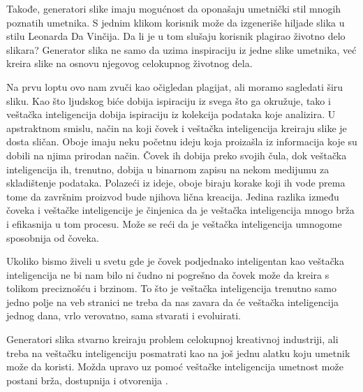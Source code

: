 \documentclass[12pt, letterpaper]{article}
\begin{document}
Takođe, generatori slike imaju mogućnost da oponašaju umetnički stil mnogih poznatih umetnika. S jednim klikom korisnik može da izgeneriše hiljade slika u stilu Leonarda Da Vinčija. Da li je u tom slušaju korisnik plagirao životno delo slikara? Generator slika ne samo da uzima inspiraciju iz jedne slike umetnika, već kreira slike na osnovu njegovog celokupnog životnog dela.

Na prvu loptu ovo nam zvuči kao očigledan plagijat, ali moramo sagledati širu sliku. Kao što ljudskog biće dobija ispiraciju iz svega što ga okružuje, tako i veštačka inteligencija dobija ispiraciju iz kolekcija podataka koje analizira. U apstraktnom smislu, način na koji čovek i veštačka inteligencija kreiraju slike je dosta sličan. Oboje imaju neku početnu ideju koja proizašla iz informacija koje su dobili na njima prirodan način. Čovek ih dobija preko svojih čula, dok veštačka inteligencija ih, trenutno, dobija u binarnom zapisu na nekom medijumu za skladištenje podataka. Polazeći iz ideje, oboje biraju korake koji ih vode prema tome da završnim proizvod bude njihova lična kreacija. Jedina razlika između čoveka i veštačke inteligencije je činjenica da je veštačka inteligencija mnogo brža i efikasnija u tom procesu. Može se reći da je veštačka inteligencija umnogome sposobnija od čoveka. 

Ukoliko bismo živeli u svetu gde je čovek podjednako inteligentan kao veštačka inteligencija ne bi nam bilo ni čudno ni pogrešno da čovek može da kreira s tolikom preciznošću i brzinom. To što je veštačka inteligencija trenutno samo jedno polje na veb stranici ne treba da nas zavara da će veštačka inteligencija jednog dana, vrlo verovatno, sama stvarati i evoluirati.

Generatori slika stvarno kreiraju problem celokupnoj kreativnoj industriji, ali treba na veštačku inteligenciju posmatrati kao na još jednu alatku koju umetnik može da koristi. Možda upravo uz pomoć veštačke inteligencija umetnost može postani brža, dostupnija i otvorenija \cite{fear}.
\end{document}
